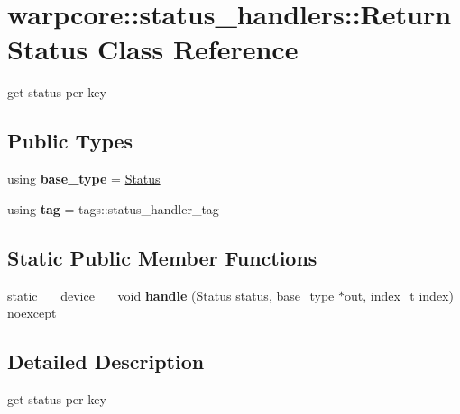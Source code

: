 \hypertarget{classwarpcore_1_1status__handlers_1_1ReturnStatus}{}\section{warpcore\+:\+:status\+\_\+handlers\+:\+:Return\+Status Class Reference}
\label{classwarpcore_1_1status__handlers_1_1ReturnStatus}


get status per key  


\subsection*{Public Types}
\begin{DoxyCompactItemize}
\item 
\mbox{\label{classwarpcore_1_1status__handlers_1_1ReturnStatus_a3e16c8e7a75e808d451ac77b724ad8b0}} 
using {\bfseries base\+\_\+type} = \hyperlink{classwarpcore_1_1Status}{Status}
\item 
\mbox{\label{classwarpcore_1_1status__handlers_1_1ReturnStatus_a29d286fefb3b1f8ff620fd6bac39c063}} 
using {\bfseries tag} = tags\+::status\+\_\+handler\+\_\+tag
\end{DoxyCompactItemize}
\subsection*{Static Public Member Functions}
\begin{DoxyCompactItemize}
\item 
\mbox{\label{classwarpcore_1_1status__handlers_1_1ReturnStatus_ab8f496367e830907433b9f5965477f6f}} 
static \+\_\+\+\_\+device\+\_\+\+\_\+ void {\bfseries handle} (\hyperlink{classwarpcore_1_1Status}{Status} status, \hyperlink{classwarpcore_1_1Status}{base\+\_\+type} $\ast$out, index\+\_\+t index) noexcept
\end{DoxyCompactItemize}


\subsection{Detailed Description}
get status per key 